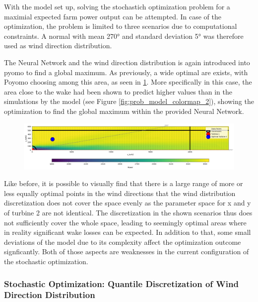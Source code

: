 With the model set up, solving the stochastich optimization problem for a maximial expected farm power output can be attempted. In case of the optimization, the problem is limited to three scenarios due to computational constraints. A normal with mean  270° and  standard deviation 5° was therefore used as wind direction distribution.

The Neural Network and the wind direction distribution is  again introduced into pyomo to find a global maximum. As previously, a wide optimal are exists, with Poyomo choosing among this area, as seen in \ref{fig:prob_data_lininter}. More specifically in this case, the area close to the wake had been shown to predict higher values than in the simulations by the model (see Figure \ref{fig:prob_model_colormap_2}), showing the optimization to find the global maximum within the provided Neural Network. 

\begin{figure}[h] 
	\centering
	\includegraphics[width=1\textwidth]{figures/optimization/prob_data_lininter.png} 
	\caption{}
	\label{fig:prob_data_lininter}
\end{figure}

Like before, it is possible to visually find that there is a large range of more or less equally optimal points in the wind directions that the wind distribution discretization does not cover the space evenly as the parameter space for x and y of turbine 2 are not identical. The discretization in the shown scenarios thus does not sufficiently cover the whole space, leading to seemingly optimal areas where in reality significant wake losses can be expected. In addition to that, some small deviations of the model due to its complexity affect the optimization outcome signficantly. Both of those aspects are weaknesses in the current configuration of the stochastic optimization.
	
\subsubsection{Stochastic Optimization: Quantile Discretization of Wind Direction Distribution }

